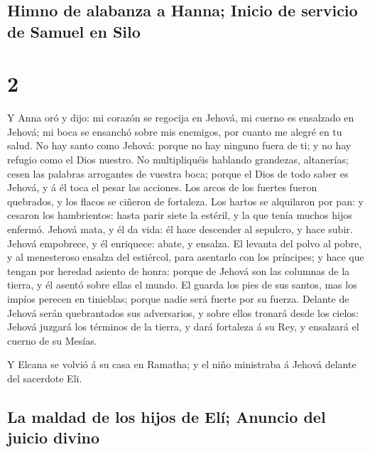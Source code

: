 \hypertarget{himno-de-alabanza-a-hanna-inicio-de-servicio-de-samuel-en-silo}{%
\subsection{Himno de alabanza a Hanna; Inicio de servicio de Samuel en
Silo}\label{himno-de-alabanza-a-hanna-inicio-de-servicio-de-samuel-en-silo}}

\hypertarget{section-09-2}{%
\section{2}\label{section-09-2}}

 Y Anna oró y dijo: mi corazón se regocija en Jehová, mi
cuerno es ensalzado en Jehová; mi boca se ensanchó sobre mis enemigos,
por cuanto me alegré en tu salud.  No hay santo como
Jehová: porque no hay ninguno fuera de ti; y no hay refugio como el Dios
nuestro.  No multipliquéis hablando grandezas, altanerías;
cesen las palabras arrogantes de vuestra boca; porque el Dios de todo
saber es Jehová, y á él toca el pesar las acciones.  Los
arcos de los fuertes fueron quebrados, y los flacos se ciñeron de
fortaleza.  Los hartos se alquilaron por pan: y cesaron
los hambrientos: hasta parir siete la estéril, y la que tenía muchos
hijos enfermó.  Jehová mata, y él da vida: él hace
descender al sepulcro, y hace subir.  Jehová empobrece, y
él enriquece: abate, y ensalza.  El levanta del polvo al
pobre, y al menesteroso ensalza del estiércol, para asentarlo con los
príncipes; y hace que tengan por heredad asiento de honra: porque de
Jehová son las columnas de la tierra, y él asentó sobre ellas el mundo.
 El guarda los pies de sus santos, mas los impíos perecen
en tinieblas; porque nadie será fuerte por su fuerza. 
Delante de Jehová serán quebrantados sus adversarios, y sobre ellos
tronará desde los cielos: Jehová juzgará los términos de la tierra, y
dará fortaleza á su Rey, y ensalzará el cuerno de su Mesías.

 Y Elcana se volvió á su casa en Ramatha; y el niño
ministraba á Jehová delante del sacerdote Eli.

\hypertarget{la-maldad-de-los-hijos-de-eluxed-anuncio-del-juicio-divino}{%
\subsection{La maldad de los hijos de Elí; Anuncio del juicio
divino}\label{la-maldad-de-los-hijos-de-eluxed-anuncio-del-juicio-divino}}

